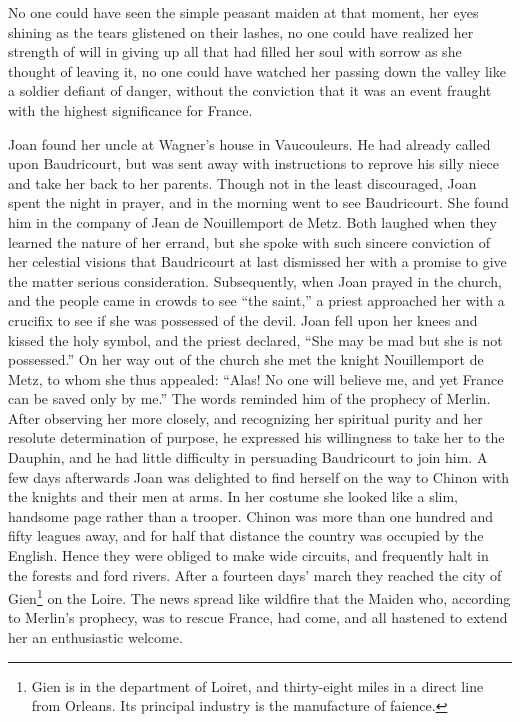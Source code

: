 No one could have seen the simple peasant maiden at that moment, her
eyes shining as the tears glistened on their lashes, no one could have
realized her strength of will in giving up all that had filled her soul
with sorrow as she thought of leaving it, no one could have watched her
passing down the valley like a soldier defiant of danger, without the
conviction that it was an event fraught with the highest significance
for France.

Joan found her uncle at Wagner's house in Vaucouleurs. He had already
called upon Baudricourt, but was sent away with instructions to reprove
his silly niece and take her back to her parents. Though not in the
least discouraged, Joan spent the night in prayer, and in the morning
went to see Baudricourt. She found him in the company of Jean de
Nouillemport de Metz. Both laughed when they learned the nature of her
errand, but she spoke with such sincere conviction of her celestial
visions that Baudricourt at last dismissed her with a promise to give
the matter serious consideration. Subsequently, when Joan prayed in the
church, and the people came in crowds to see ``the saint,'' a priest
approached her with a crucifix to see if she was possessed of the devil.
Joan fell upon her knees and kissed the holy symbol, and the priest
declared, ``She may be mad but she is not possessed.'' On her way out of
the church she met the knight Nouillemport de Metz, to whom she thus
appealed: ``Alas! No one will believe me, and yet France can be saved
only by me.'' The words reminded him of the prophecy of Merlin. After
observing her more closely, and recognizing her spiritual purity and her
resolute determination of purpose, he expressed his willingness to take
her to the Dauphin, and he had little difficulty in persuading
Baudricourt to join him. A few days afterwards Joan was delighted to
find herself on the way to Chinon with the knights and their men at
arms. In her costume she looked like a slim, handsome page rather than a
trooper. Chinon was more than one hundred and fifty leagues away, and
for half that distance the country was occupied by the English. Hence
they were obliged to make wide circuits, and frequently halt in the
forests and ford rivers. After a fourteen days' march they reached the
city of Gien\footnote{Gien is in the department of Loiret, and
  thirty-eight miles in a direct line from Orleans. Its principal
  industry is the manufacture of faience.} on the Loire. The news spread
like wildfire that the Maiden who, according to Merlin's prophecy, was
to rescue France, had come, and all hastened to extend her an
enthusiastic welcome.

